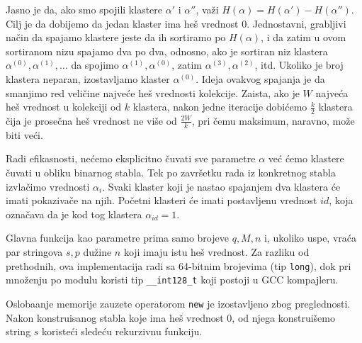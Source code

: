 Jasno je da, ako smo spojili klastere $\alpha'$ i $\alpha''$, va\v zi $H(\alpha) = H(\alpha') - H(\alpha'')$. Cilj je da dobijemo da jedan klaster ima he\v s vrednost $0$. Jednostavni, grabljivi na\v cin da spajamo klastere jeste da ih sortiramo po $H(\alpha)$, i da zatim u ovom sortiranom nizu spajamo dva po dva, odnosno, ako je sortiran niz klastera $\alpha^{(0)}, \alpha^{(1)}, \ldots$ da spojimo $\alpha^{(1)}, \alpha^{(0)}$, zatim $\alpha^{(3)}, \alpha^{(2)}$, itd. Ukoliko je broj klastera neparan, izostavljamo klaster $\alpha^{(0)}$. Ideja ovakvog spajanja je da smanjimo red veli\v cine najve\' ce he\v s vrednosti kolekcije. Zaista, ako je $W$ najve\' ca he\v s vrednost u kolekciji od $k$ klastera, nakon jedne iteracije dobi\' cemo $\frac{k}{2}$ klastera \v cija je prose\v cna he\v s vrednost ne vi\v se od $\frac{2W}{k}$, pri \v cemu maksimum, naravno, mo\v ze biti ve\' ci.

Radi efikasnosti, ne\' cemo eksplicitno \v cuvati sve parametre $\alpha$ ve\' c \' cemo klastere \v cuvati u obliku binarnog stabla. Tek po zavr\v setku rada iz konkretnog stabla izvla\v cimo vrednosti $\alpha_i$. Svaki klaster koji je nastao spajanjem dva klastera \' ce imati pokaziva\v ce na njih. Po\v cetni klasteri \' ce imati postavljenu vrednost $id$, koja ozna\v cava da je kod tog klastera $\alpha_{id} = 1$.

\noindent
\begin{minipage}[l]{\textwidth}

\end{minipage}

Glavna funkcija kao parametre prima samo brojeve $q,M,n$ i, ukoliko uspe, vra\' ca par stringova $s,p$ du\v zine $n$ koji imaju istu he\v s vrednost. Za razliku od prethodnih, ova implementacija radi sa 64-bitnim brojevima (tip \texttt{long}), dok pri mno\v zenju po modulu koristi tip \texttt{\_\_int128\_t} koji postoji u GCC kompajleru.

\noindent
\begin{minipage}[l]{\textwidth}

\end{minipage}

Osloba\dj anje memorije zauzete operatorom \texttt{new} je izostavljeno zbog preglednosti. Nakon konstruisanog stabla koje ima he\v s vrednost $0$, od njega konstrui\v semo string $s$ koriste\' ci slede\' cu rekurzivnu funkciju.

